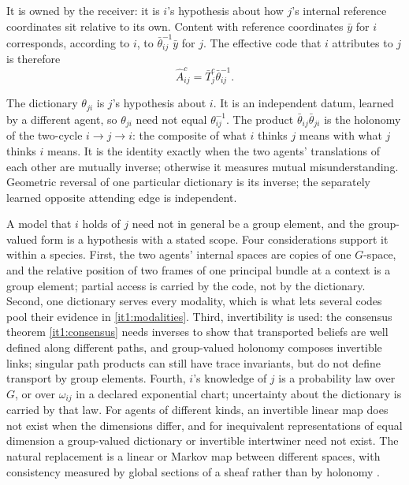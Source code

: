 \documentclass[11pt,letterpaper]{report}
\begin{document}
It is owned by the receiver: it is $i$'s hypothesis about how $j$'s internal reference coordinates sit relative to its own. Content with reference coordinates $\bar y$ for $i$ corresponds, according to $i$, to $\bar\theta_{ij}^{-1}\bar y$ for $j$. The effective code that $i$ attributes to $j$ is therefore
\begin{equation}
\hat A_{ij}^c=\bar T_j^c\bar\theta_{ij}^{-1}.
\label{it1:effective-code}
\end{equation}

The dictionary $\theta_{ji}$ is $j$'s hypothesis about $i$. It is an independent datum, learned by a different agent, so $\theta_{ji}$ need not equal $\theta_{ij}^{-1}$. The product $\bar\theta_{ij}\bar\theta_{ji}$ is the holonomy of the two-cycle $i\to j\to i$: the composite of what $i$ thinks $j$ means with what $j$ thinks $i$ means. It is the identity exactly when the two agents' translations of each other are mutually inverse; otherwise it measures mutual misunderstanding. Geometric reversal of one particular dictionary is its inverse; the separately learned opposite attending edge is independent.

A model that $i$ holds of $j$ need not in general be a group element, and the group-valued form is a hypothesis with a stated scope. Four considerations support it within a species. First, the two agents' internal spaces are copies of one $G$-space, and the relative position of two frames of one principal bundle at a context is a group element; partial access is carried by the code, not by the dictionary. Second, one dictionary serves every modality, which is what lets several codes pool their evidence in \cref{it1:modalities}. Third, invertibility is used: the consensus theorem \cref{it1:consensus} needs inverses to show that transported beliefs are well defined along different paths, and group-valued holonomy composes invertible links; singular path products can still have trace invariants, but do not define transport by group elements. Fourth, $i$'s knowledge of $j$ is a probability law over $G$, or over $\omega_{ij}$ in a declared exponential chart; uncertainty about the dictionary is carried by that law. For agents of different kinds, an invertible linear map does not exist when the dimensions differ, and for inequivalent representations of equal dimension a group-valued dictionary or invertible intertwiner need not exist. The natural replacement is a linear or Markov map between different spaces, with consistency measured by global sections of a sheaf rather than by holonomy \citep{HansenGhrist2021}.
\end{document}
